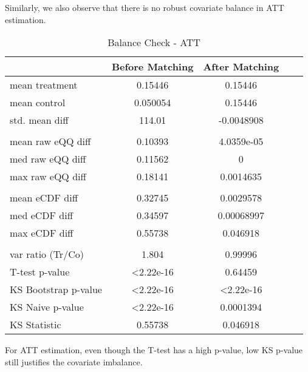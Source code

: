 \documentclass{article}[12pt]
\begin{document}
Similarly, we also observe that there is no robust covariate balance in ATT estimation.  \par
\begin{table}[htbp]
    \centering
    \caption{Balance Check - ATT}
    \label{tab: Balance Check - ATT}
    \begin{tabular}{lcccc}
        \toprule
         & \textbf{Before Matching} & \textbf{After Matching}  \\ 
        \midrule
         mean treatment & 0.15446 & 0.15446  \\
         mean control & 0.050054 & 0.15446  \\
         std. mean diff & 114.01 & -0.0048908 \\
         \\
         mean raw eQQ diff & 0.10393 & 4.0359e-05 \\
         med raw eQQ diff & 0.11562 & 0 \\
         max raw eQQ diff & 0.18141 & 0.0014635  \\
         \\
         mean eCDF diff & 0.32745 & 0.0029578 \\
         med eCDF diff & 0.34597 & 0.00068997 \\
         max eCDF diff & 0.55738 & 0.046918 \\
         \\
         var ratio (Tr/Co) & 1.804 & 0.99996 \\
         T-test p-value & \textless 2.22e-16 & 0.64459 \\
         KS Bootstrap p-value & \textless 2.22e-16 & \textless 2.22e-16 \\
         KS Naive p-value & \textless 2.22e-16 & 0.0001394 \\
         KS Statistic &  0.55738 & 0.046918 \\        
        \bottomrule
    \end{tabular}
\end{table}
For ATT estimation, even though the T-test has a high p-value, low KS p-value still justifies the covariate imbalance. \par
\end{document}
